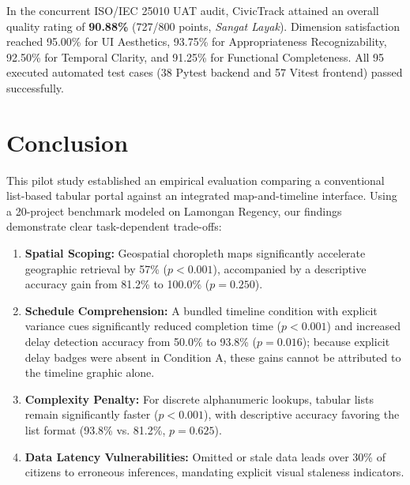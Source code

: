 \documentclass[runningheads]{llncs}
\newcommand{\hl}[1]{#1}
\begin{document}
In the concurrent ISO/IEC 25010 UAT audit, CivicTrack attained an overall quality rating of \textbf{90.88\%} (727/800 points, \emph{Sangat Layak}). Dimension satisfaction reached 95.00\% for UI Aesthetics, 93.75\% for Appropriateness Recognizability, 92.50\% for Temporal Clarity, and 91.25\% for Functional Completeness. All 95 executed automated test cases (38 Pytest backend and 57 Vitest frontend) passed successfully.


\section{Conclusion}
This pilot study established an empirical evaluation comparing a conventional list-based tabular portal against an integrated map-and-timeline interface. Using a 20-project benchmark modeled on Lamongan Regency, our findings demonstrate clear task-dependent trade-offs:
\begin{enumerate}\setlength{\itemsep}{-1pt}\setlength{\parskip}{0pt}
    \item \textbf{Spatial Scoping:} Geospatial choropleth maps significantly accelerate geographic retrieval by 57\% ($p < 0.001$), accompanied by a descriptive accuracy gain from 81.2\% to 100.0\% ($p = 0.250$).
    \item \textbf{Schedule Comprehension:} \hl{A bundled timeline condition with explicit variance cues significantly reduced completion time ($p < 0.001$) and increased delay detection accuracy from 50.0\% to 93.8\% ($p = 0.016$); because explicit delay badges were absent in Condition A, these gains cannot be attributed to the timeline graphic alone.}
    \item \textbf{Complexity Penalty:} For discrete alphanumeric lookups, tabular lists remain significantly faster ($p < 0.001$), with descriptive accuracy favoring the list format (93.8\% vs. 81.2\%, $p = 0.625$).
    \item \textbf{Data Latency Vulnerabilities:} Omitted or stale data leads over 30\% of citizens to erroneous inferences, mandating explicit visual staleness indicators.
\end{enumerate}
\end{document}
